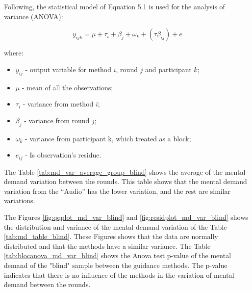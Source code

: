 Following, the statistical model of Equation 5.1 is used for the analysis of variance (ANOVA): 

\begin{equation}
    \label{eq:statistical_model}
    y_{ijk} = \mu + \tau_i + \beta_j +\omega_k + (\tau\beta_{ij}) + e
\end{equation}

where:

\begin{itemize}
    \item $y_{ij}$ - output variable for method $i$, round $j$ and participant $k$;
    \item $\mu$ - mean of all the observations;
    \item $\tau_i$ - variance from method $i$;
    \item $\beta_j$ - variance from round $j$;
    \item $\omega_k$ - variance from participant k, which treated as a block;
    \item $e_{ij}$ - Is observation's residue.
\end{itemize}




%

The Table \ref{tab:md_var_average_group_blind} shows the average of the mental demand variation between the rounds. This table shows that the mental demand variation from the “Audio” has the lower variation, and the rest are similar variations.



The Figures \ref{fig:qqplot_md_var_blind} and \ref{fig:residplot_md_var_blind} shows the distribution and variance of the mental demand variation of the Table \ref{tab:md_table_blind}. These Figures shows that the data are normally distributed and that the methods have a similar variance.
The Table \ref{tab:blocanova_md_var_blind} shows the Anova test p-value of the mental demand of the "blind" sample between the guidance methods. The p-value indicates that there is no influence of the methods in the variation of mental demand between the rounds. 

